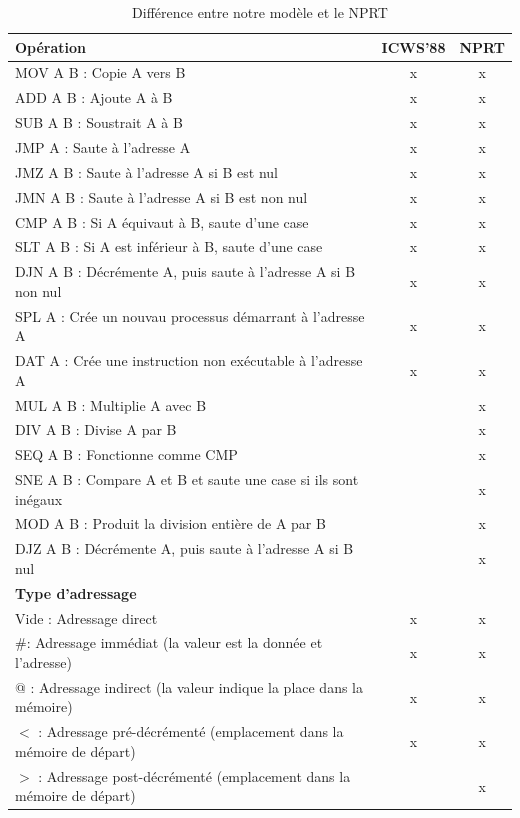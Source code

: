 \documentclass[a4paper,12pt]{article}
\begin{document}
\begin{table}[H]
\begin{tabular}{|l|c|c|}
\hline
\textbf{Opération} & ICWS’88 & NPRT \\
\hline
MOV A B : Copie A vers B & x & x \\
\hline
ADD A B : Ajoute A à B & x & x \\
\hline
SUB A B : Soustrait A à B & x & x \\
\hline
JMP A : Saute à l'adresse A & x & x\\
\hline
JMZ A B : Saute à l'adresse A si B est nul & x & x\\
\hline
JMN A B : Saute à l'adresse A si B est non nul & x & x \\
\hline
CMP A B : Si A équivaut à B, saute d'une case & x & x \\
\hline
SLT A B : Si A est inférieur à B, saute d'une case & x & x \\
\hline
DJN A B : Décrémente A, puis saute à l'adresse A si B non nul & x & x \\
\hline
SPL A : Crée un nouvau processus démarrant à l'adresse A & x & x \\
\hline
DAT A : Crée une instruction non exécutable à l'adresse A & x & x \\
\hline
MUL A B : Multiplie A avec B &  & x \\
\hline
DIV A B : Divise A par B &  & x \\
\hline
SEQ A B : Fonctionne comme CMP & & x\\
\hline
SNE A B : Compare A et B et saute une case si ils sont inégaux & & x\\
\hline
MOD A B : Produit la division entière de A par B & & x\\
\hline
DJZ A B : Décrémente A, puis saute à l'adresse A si B nul & & x\\
\hline
\textbf{Type d'adressage} &  &\\
\hline
Vide : Adressage direct & x & x \\
\hline
\#: Adressage immédiat (la valeur est la donnée et l'adresse) & x & x\\
\hline
@ : Adressage indirect (la valeur indique la place dans la mémoire) & x & x\\
\hline
$<$ : Adressage pré-décrémenté (emplacement dans la mémoire de départ) & x & x\\
\hline
$>$ : Adressage post-décrémenté (emplacement dans la mémoire de départ) &  & x\\
\hline

\end{tabular}
\caption{Différence entre notre modèle et le NPRT}
\end{table}
\end{document}
